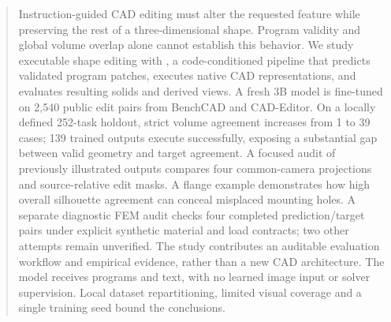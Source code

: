 \begin{abstract}
Instruction-guided CAD editing must alter the requested feature while preserving the rest of a three-dimensional shape. Program validity and global volume overlap alone cannot establish this behavior. We study executable shape editing with \ours, a code-conditioned pipeline that predicts validated program patches, executes native CAD representations, and evaluates resulting solids and derived views. A fresh 3B model is fine-tuned on 2,540 public edit pairs from BenchCAD and CAD-Editor. On a locally defined 252-task holdout, strict volume agreement increases from 1 to 39 cases; 139 trained outputs execute successfully, exposing a substantial gap between valid geometry and target agreement. A focused audit of previously illustrated outputs compares four common-camera projections and source-relative edit masks. A flange example demonstrates how high overall silhouette agreement can conceal misplaced mounting holes. A separate diagnostic FEM audit checks four completed prediction/target pairs under explicit synthetic material and load contracts; two other attempts remain unverified. The study contributes an auditable evaluation workflow and empirical evidence, rather than a new CAD architecture. The model receives programs and text, with no learned image input or solver supervision. Local dataset repartitioning, limited visual coverage and a single training seed bound the conclusions.
\end{abstract}
